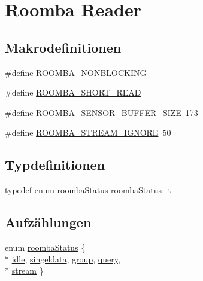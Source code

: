 \hypertarget{group__reader}{\section{Roomba Reader}
\label{group__reader}
}
\subsection*{Makrodefinitionen}
\begin{DoxyCompactItemize}
\item 
\#define \hyperlink{group__reader_gad57079c91b29054a870a52e296de7c8f}{R\-O\-O\-M\-B\-A\-\_\-\-N\-O\-N\-B\-L\-O\-C\-K\-I\-N\-G}
\item 
\#define \hyperlink{group__reader_ga6c7a085dd8b07086302a3522eacb1d7b}{R\-O\-O\-M\-B\-A\-\_\-\-S\-H\-O\-R\-T\-\_\-\-R\-E\-A\-D}
\item 
\#define \hyperlink{group__reader_gab5ab726f0bd857186141a6e7659f75df}{R\-O\-O\-M\-B\-A\-\_\-\-S\-E\-N\-S\-O\-R\-\_\-\-B\-U\-F\-F\-E\-R\-\_\-\-S\-I\-Z\-E}~173
\item 
\#define \hyperlink{group__reader_ga2079001845af1fd6a4e1155bb27519c6}{R\-O\-O\-M\-B\-A\-\_\-\-S\-T\-R\-E\-A\-M\-\_\-\-I\-G\-N\-O\-R\-E}~50
\end{DoxyCompactItemize}
\subsection*{Typdefinitionen}
\begin{DoxyCompactItemize}
\item 
typedef enum \hyperlink{group__reader_ga74bd1c0af119d3680033932aee94d998}{roomba\-Status} \hyperlink{group__reader_gaee08b378f859db5b29b55d1c980a8df9}{roomba\-Status\-\_\-t}
\end{DoxyCompactItemize}
\subsection*{Aufzählungen}
\begin{DoxyCompactItemize}
\item 
enum \hyperlink{group__reader_ga74bd1c0af119d3680033932aee94d998}{roomba\-Status} \{ \\*
\hyperlink{group__reader_gga74bd1c0af119d3680033932aee94d998a0e9a37114c0e458d28d52f06ec0f2242}{idle}, 
\hyperlink{group__reader_gga74bd1c0af119d3680033932aee94d998a0f5565850b8d65e6ecd05739440bb48a}{singeldata}, 
\hyperlink{group__reader_gga74bd1c0af119d3680033932aee94d998a084e12cf09138eec8d807c9ca90d1021}{group}, 
\hyperlink{group__reader_gga74bd1c0af119d3680033932aee94d998a87aed4f2a754303740474022109f678a}{query}, 
\\*
\hyperlink{group__reader_gga74bd1c0af119d3680033932aee94d998a8c135cc3d1b918bd7b75a65104cac458}{stream}
 \}
\end{DoxyCompactItemize}
